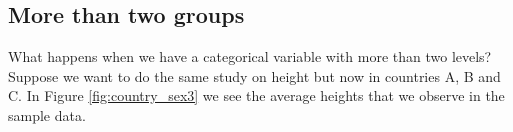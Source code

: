 





\subsection{More than two groups}

What happens when we have a categorical variable with more than two levels? Suppose we want to do the same study on height but now in countries A, B and C. In Figure \ref{fig:country_sex3} we see the average heights that we observe in the sample data.

